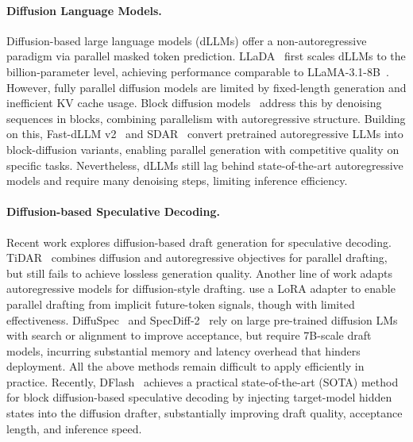 \documentclass{article}
\begin{document}
\paragraph{Diffusion Language Models.}
Diffusion-based large language models (dLLMs) offer a non-autoregressive paradigm via parallel masked token prediction. LLaDA~\cite{nie2025largelanguagediffusionmodels} first scales dLLMs to the billion-parameter level, achieving performance comparable to LLaMA-3.1-8B~\cite{grattafiori2024llama}. However, fully parallel diffusion models are limited by fixed-length generation and inefficient KV cache usage. Block diffusion models~\cite{arriola2025blockdiffusioninterpolatingautoregressive} address this by denoising sequences in blocks, combining parallelism with autoregressive structure. Building on this, Fast-dLLM v2~\cite{wu2025fastdllmv2efficientblockdiffusion} and SDAR~\cite{cheng2025sdarsynergisticdiffusionautoregressionparadigm} convert pretrained autoregressive LLMs into block-diffusion variants, enabling parallel generation with competitive quality on specific tasks. Nevertheless, dLLMs still lag behind state-of-the-art autoregressive models and require many denoising steps, limiting inference efficiency.

\paragraph{Diffusion-based Speculative Decoding.}
Recent work explores diffusion-based draft generation for speculative decoding. TiDAR~\cite{liu2025tidarthinkdiffusiontalk} combines diffusion and autoregressive objectives for parallel drafting, but still fails to achieve lossless generation quality. Another line of work adapts autoregressive models for diffusion-style drafting. \cite{samragh2025llmknowsfutureuncovering} use a LoRA adapter to enable parallel drafting from implicit future-token signals, though with limited effectiveness. DiffuSpec~\cite{li2025diffuspecunlockingdiffusionlanguage} and SpecDiff-2~\cite{sandler2025specdiff2scalingdiffusiondrafter} rely on large pre-trained diffusion LMs with search or alignment to improve acceptance, but require 7B-scale draft models, incurring substantial memory and latency overhead that hinders deployment. All the above methods remain difficult to apply efficiently in practice. Recently, DFlash~\cite{chen2026dflash} achieves a practical state-of-the-art (SOTA) method for block diffusion-based speculative decoding by injecting target-model hidden states into the diffusion drafter, substantially improving draft quality, acceptance length, and inference speed.
\end{document}
